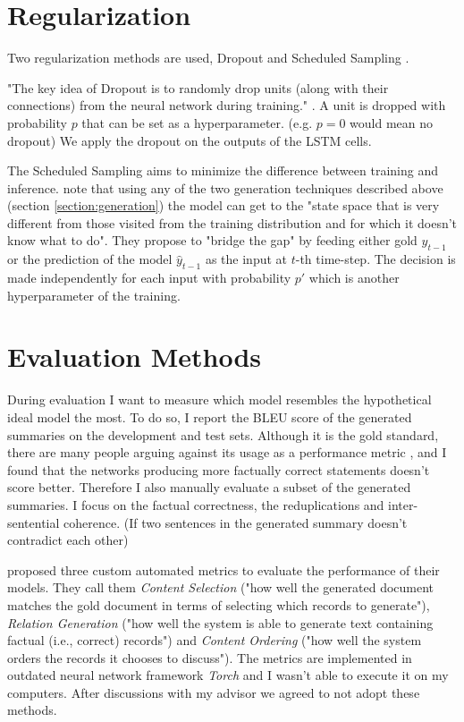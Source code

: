 \section{Regularization}

Two regularization methods are used, Dropout and Scheduled Sampling \citep{bengio2015scheduled}.

"The key idea of Dropout is to randomly drop units (along with their connections) from the neural network during training." \citep{srivastavaDropout2014}. A unit is dropped with probability $p$ that can be set as a hyperparameter. (e.g. $p = 0$ would mean no dropout)  We apply the dropout on the outputs of the LSTM cells.

The Scheduled Sampling aims to minimize the difference between training and inference. \citep{bengio2015scheduled} note that using any of the two generation techniques described above (section \ref{section:generation}) the model can get to the "state space that is very different from those visited from the  training distribution and for which it doesn’t know what to do". They propose to "bridge the gap" by feeding either gold $y_{t-1}$ or the prediction of the model $\hat{y}_{t-1}$ as the input at $t$-th time-step. The decision is made independently for each input with probability $p'$ which is another hyperparameter of the training.

\section{Evaluation Methods}

During evaluation I want to measure which model resembles the hypothetical ideal model the most. To do so, I report the BLEU score \citep{papineni2002} of the generated summaries on the development and test sets. Although it is the gold standard, there are many people arguing against its usage as a performance metric \citep{celikyilmaz2021evaluation}, and I found that the networks producing more factually correct statements doesn't score better. Therefore I also manually evaluate a subset of the generated summaries. I focus on the factual correctness, the reduplications and inter-sentential coherence. (If two sentences in the generated summary doesn't contradict each other)

\citep{wiseman2017} proposed three custom automated metrics to evaluate the performance of their models. They call them \emph{Content Selection} ("how well the generated document matches the gold document in terms of selecting which records to generate"), \emph{Relation Generation} ("how well the system is able to generate text containing factual (i.e., correct) records") and \emph{Content Ordering} ("how well the system orders the records it chooses to discuss"). The metrics are implemented in outdated neural network framework \emph{Torch} and I wasn't able to execute it on my computers. After discussions with my advisor we agreed to not adopt these methods.

